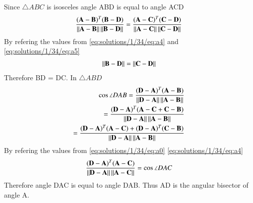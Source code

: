 Since $\triangle ABC$ is isosceles angle ABD is equal to angle ACD
\begin{align}
\frac{(\mathbf{A}-\mathbf{B})^T(\mathbf{B}-\mathbf{D})}{\left\lVert\mathbf{A}-\mathbf{B}\right\rVert\left\lVert\mathbf{B}-\mathbf{D}\right\rVert} =
\frac{(\mathbf{A}-\mathbf{C})^T(\mathbf{C}-\mathbf{D})}{\left\lVert\mathbf{A}-\mathbf{C}\right\rVert\left\lVert\mathbf{C}-\mathbf{D}\right\rVert} 
\end{align}
By refering the values from \ref{eq:solutions/1/34/eq:a4} and \ref{eq:solutions/1/34/eq:a5}
\begin{align}
\left\lVert\mathbf{B}-\mathbf{D}\right\rVert = \left\lVert\mathbf{C}-\mathbf{D}\right\rVert
\label{eq:solutions/1/34/eq:a6}
\end{align}
Therefore BD = DC. In $\triangle ABD$
\begin{align}
\cos{\angle DAB} = \frac{(\mathbf{D}-\mathbf{A})^T(\mathbf{A}-\mathbf{B})}{\left\lVert\mathbf{D}-\mathbf{A}\right\rVert\left\lVert\mathbf{A}-\mathbf{B}\right\rVert} \\ =
\frac{(\mathbf{D}-\mathbf{A})^T(\mathbf{A}-\mathbf{C}+\mathbf{C}-\mathbf{B})}{\left\lVert\mathbf{D}-\mathbf{A}\right\rVert\left\lVert\mathbf{A}-\mathbf{B}\right\rVert} \\ =
\frac{(\mathbf{D}-\mathbf{A})^T(\mathbf{A}-\mathbf{C})+(\mathbf{D}-\mathbf{A})^T(\mathbf{C}-\mathbf{B})}{\left\lVert\mathbf{D}-\mathbf{A}\right\rVert\left\lVert\mathbf{A}-\mathbf{B}\right\rVert}
\end{align}
By refering the values from \eqref{eq:solutions/1/34/eq:a0} \eqref{eq:solutions/1/34/eq:a4}
\begin{align}
\frac{(\mathbf{D}-\mathbf{A})^T(\mathbf{A}-\mathbf{C})}{\left\lVert\mathbf{D}-\mathbf{A}\right\rVert\left\lVert\mathbf{A}-\mathbf{C}\right\rVert} = \cos{\angle DAC}
\end{align}
Therefore angle DAC is equal to angle DAB. Thus AD is the angular bisector of angle A.
